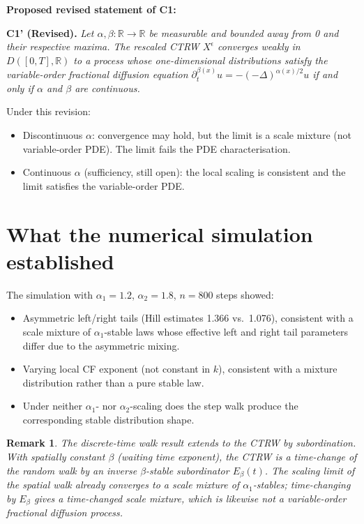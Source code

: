 \documentclass{amsart}
\newtheorem{remark}[theorem]{Remark}
\theoremstyle{definition}
\begin{document}
\textbf{Proposed revised statement of C1:}

\medskip
\noindent\textbf{C1' (Revised).}
\textit{Let $\alpha, \beta \colon \mathbb{R} \to \mathbb{R}$ be measurable and bounded
away from 0 and their respective maxima. The rescaled CTRW $X^\epsilon$ converges weakly
in $D([0,T], \mathbb{R})$ to a process whose one-dimensional distributions satisfy the
variable-order fractional diffusion equation
$\partial_t^{\beta(x)} u = -(-\Delta)^{\alpha(x)/2} u$
if and only if $\alpha$ and $\beta$ are continuous.}
\medskip

Under this revision:
\begin{itemize}
    \item Discontinuous $\alpha$: convergence may hold, but the limit is a scale
          mixture (not variable-order PDE). The limit fails the PDE characterisation.
    \item Continuous $\alpha$ (sufficiency, still open): the local scaling is consistent
          and the limit satisfies the variable-order PDE.
\end{itemize}

\section{What the numerical simulation established}

The simulation with $\alpha_1 = 1.2$, $\alpha_2 = 1.8$, $n = 800$ steps showed:
\begin{itemize}
    \item Asymmetric left/right tails (Hill estimates 1.366 vs.\ 1.076), consistent
          with a scale mixture of $\alpha_1$-stable laws whose effective left and right
          tail parameters differ due to the asymmetric mixing.
    \item Varying local CF exponent (not constant in $k$), consistent with a mixture
          distribution rather than a pure stable law.
    \item Under neither $\alpha_1$- nor $\alpha_2$-scaling does the step walk produce
          the corresponding stable distribution shape.
\end{itemize}

\begin{remark}
\label{rem:ctrw}
The discrete-time walk result extends to the CTRW by subordination. With spatially
constant $\beta$ (waiting time exponent), the CTRW is a time-change of the random walk
by an inverse $\beta$-stable subordinator $E_\beta(t)$. The scaling limit of the
spatial walk already converges to a scale mixture of $\alpha_1$-stables; time-changing
by $E_\beta$ gives a time-changed scale mixture, which is likewise not a variable-order
fractional diffusion process.
\end{remark}
\end{document}
